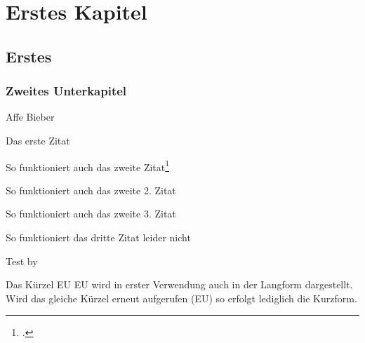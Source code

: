 \chapter{Erstes Kapitel}                %
\section{Erstes}                        %
\subsection{Zweites Unterkapitel}       %

Affe
Bieber

Das erste Zitat\par                                 %
So funktioniert auch das zweite Zitat\footcite{aristotle:physics}\par               %
So funktioniert auch das zweite 2. Zitat \cite{aristotle:physics}\par               %
So funktioniert auch das zweite 3. Zitat \autocite[80]{aristotle:physics}\par       %
So funktioniert das dritte Zitat leider nicht \autocite{aristotle:physics}\par      %
Test \citeyear{aristotle:physics} by \citeauthor{aristotle:physics}                 %

Das K\"urzel EU \ac{EU} wird in erster Verwendung auch in der Langform dargestellt.
Wird das gleiche K\"urzel erneut aufgerufen (\ac{EU}) so erfolgt lediglich die Kurzform.


